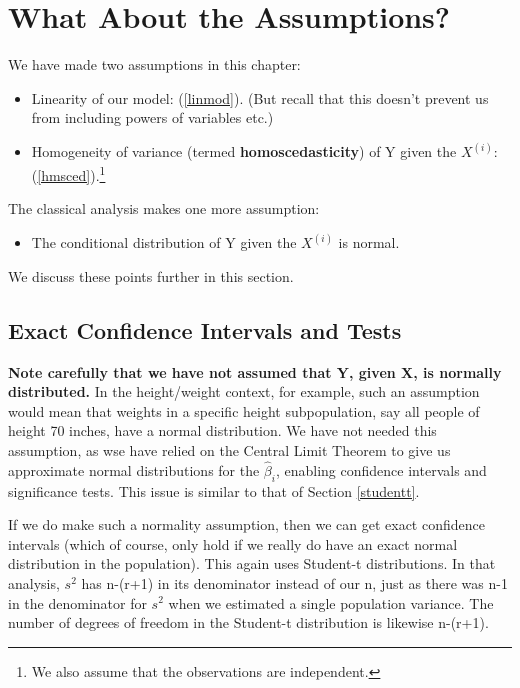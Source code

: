 \section{What About the Assumptions?}

We have made two assumptions in this chapter:

\begin{itemize}

\item Linearity of our model:  (\ref{linmod}).  (But recall that this
doesn't prevent us from including powers of variables etc.)

\item Homogeneity of variance (termed {\bf homoscedasticity}) of Y given
the $X^{(i)}$: (\ref{hmsced}).\footnote{We also assume that the
observations are independent.}

\end{itemize}

The classical analysis makes one more assumption:

\begin{itemize}

\item The conditional distribution of Y given the $X^{(i)}$ is normal.

\end{itemize}

We discuss these points further in this section.

\subsection{Exact Confidence Intervals and Tests}
\label{exactlinreg}

{\bf Note carefully that we have not assumed that Y, given X, is
normally distributed.}  In the height/weight context, for example, such
an assumption would mean that weights in a specific height
subpopulation, say all people of height 70 inches, have a normal
distribution.  We have not needed this assumption, as wse have relied on
the Central Limit Theorem to give us approximate normal distributions
for the $\widehat{\beta}_i$, enabling confidence intervals and
significance tests.  This issue is similar to that of Section
\ref{studentt}.  

If we do make such a normality assumption, then we can get exact
confidence intervals (which of course, only hold if we really do have an
exact normal distribution in the population).  This again uses Student-t
distributions.  In that analysis, $s^2$ has n-(r+1) in its denominator
instead of our n, just as there was n-1 in the denominator for $s^2$
when we estimated a single population variance.  The number of degrees
of freedom in the Student-t distribution is likewise n-(r+1).  

